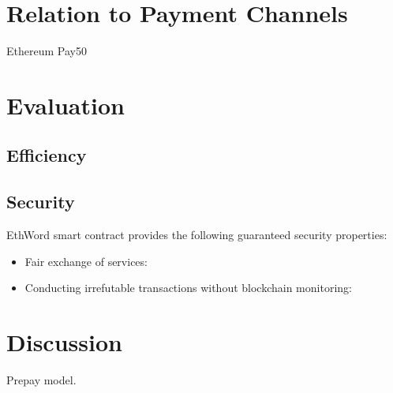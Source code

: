 
\section{Relation to Payment Channels}

Ethereum \textsf{Pay50} \cite{DF17}


\section{Evaluation}

\subsection{Efficiency}



\subsection{Security}

EthWord smart contract provides the following guaranteed security properties:
\begin{itemize}
	\item Fair exchange of services:
	\item Conducting irrefutable transactions without blockchain monitoring:
\end{itemize}


\section{Discussion}

Prepay model.














